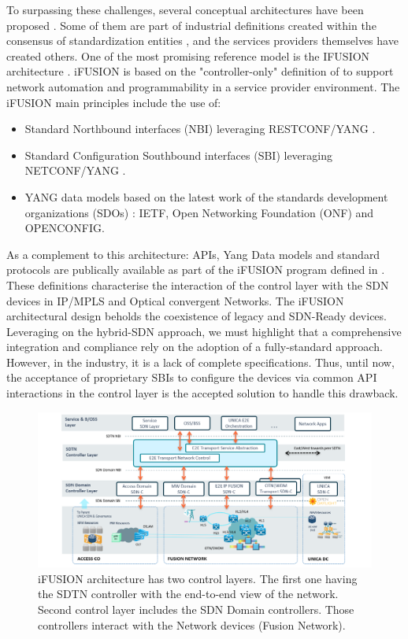 \documentclass[a4paper,fleqn]{cas-dc}
\begin{document}
To surpassing these challenges, several conceptual architectures have been proposed \cite{vissicchio2014opportunities,vissicchio2017safe}. Some of them are part of industrial definitions created within the consensus of standardization entities \cite{lee2015requirements}, and the services providers themselves have created others. One of the most promising reference model is the \uppercase{iFUSION} architecture \cite{contreras2019ifusion}. iFUSION is based on the "controller-only" definition of \cite{sinha2017survey} to support network automation and programmability in a service provider environment. The i\uppercase{FUSION} main principles include the use of:
\begin{itemize}
    \item Standard Northbound interfaces (NBI) leveraging \uppercase{RESTconf/YANG} \cite{bierman2017restconf}.
    \item Standard Configuration Southbound interfaces (SBI) leveraging \uppercase{NETCONF/YANG} \cite{enns2011network}.
    \item YANG data models based on the latest work of the standards development organizations (SDOs) \cite{bjorklund2016yang}: \uppercase{IETF}, Open Networking Foundation (ONF)  and \uppercase{OpenConfig}.
\end{itemize}

As a complement to this architecture: APIs, Yang Data models and standard protocols are publically available as part of the i\uppercase{FUSION} program  defined in  \cite{apistelefonica}. These definitions characterise the interaction of the control layer with the SDN devices in IP/MPLS and Optical convergent Networks. 
The iFUSION architectural design beholds the coexistence of legacy and SDN-Ready devices. Leveraging on the hybrid-SDN approach, we must highlight that a comprehensive integration and compliance rely on the adoption of a fully-standard approach. However,  in the industry, it is a lack of complete specifications. Thus, until now, the acceptance of proprietary SBIs to configure the devices via common API interactions in the control layer is the accepted solution to handle this drawback.

\begin{figure}
	\centering
		\includegraphics[width=\linewidth]{figs/ifusion_architecture.png}
	\caption{i\uppercase{FUSION} architecture has two control layers. The first one having the SDTN controller with the end-to-end view of the network. Second control layer includes the SDN Domain controllers. Those controllers interact with the Network devices (Fusion Network).}
	\label{FIG:1}
\end{figure}
\end{document}
